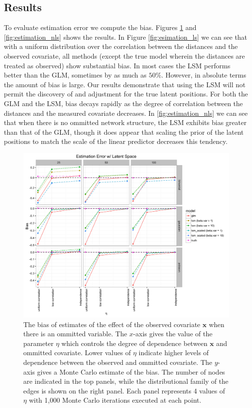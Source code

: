 \documentclass[11pt]{article}
\begin{document}
\subsection{Results}

To evaluate estimation error we compute the bias. Figures \ref{fig:estimation_ls} and \ref{fig:estimation_nls} shows the results. In Figure \ref{fig:esimation_ls} we can see that with a uniform distribution over the correlation between the distances and the observed covariate, all methods (except the true model wherein the distances are treated as observed) show substantial bias. In most cases the LSM performs better than the GLM, sometimes by as much as $50\%$. However, in absolute terms the amount of bias is large. Our results demonstrate that using the LSM will not permit the discovery of and adjustment for the true latent positions.  For both the GLM and the LSM, bias decays rapidly as the degree of correlation between the distances and the measured covariate decreases. In \ref{fig:estimation_nls} we can see that when there is no ommitted network structure, the LSM exhibits bias greater than that of the GLM, though it does appear that scaling the prior of the latent positions to match the scale of the linear predictor decreases this tendency. 

\begin{figure}
\includegraphics[width=\textwidth]{figures/estimation_ls.png}
\caption{The bias of estimates of the effect of the observed covariate $\mathbf{x}$ when there is an ommitted variable. The $x$-axis gives the value of the parameter $\eta$ which controls the degree of dependence between $\mathbf{x}$ and ommitted covariate. Lower values of $\eta$ indicate higher levels of dependence between the observed and ommitted covariate. The $y$-axis gives a Monte Carlo estimate of the bias. The number of nodes are indicated in the top panels, while the distributional family of the edges is shown on the right panel. Each panel represents 4 values of $\eta$ with 1,000 Monte Carlo iterations executed at each point.
\label{fig:estimation_ls}}
\end{figure}
\end{document}
